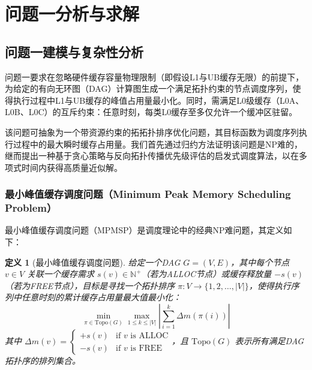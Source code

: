 \usepackage[utf8]{inputenc}
\usepackage{amssymb,amsthm}
\usepackage[ruled,vlined]{algorithm2e}  %
\usepackage{enumitem}

\newtheorem{theorem}{定理}
\newtheorem{lemma}{引理}
\newtheorem{definition}{定义}
\newtheorem{claim}{主张}


\section{问题一分析与求解}
\subsection{问题一建模与复杂性分析}
\label{subsec:problem1_analysis}

问题一要求在忽略硬件缓存容量物理限制（即假设L1与UB缓存无限）的前提下，为给定的有向无环图（DAG）计算图生成一个满足拓扑约束的节点调度序列，使得执行过程中L1与UB缓存的峰值占用量最小化。同时，需满足L0级缓存（L0A、L0B、L0C）的互斥约束：任意时刻，每类L0缓存至多仅允许一个缓冲区驻留。

该问题可抽象为一个带资源约束的拓拓扑排序优化问题，其目标函数为调度序列执行过程中的最大瞬时缓存占用量。我们首先通过归约方法证明该问题是NP难的，继而提出一种基于贪心策略与反向拓扑传播优先级评估的启发式调度算法，以在多项式时间内获得高质量近似解。

\subsubsection{最小峰值缓存调度问题（Minimum Peak Memory Scheduling Problem）}
\label{subsubsec:min_peak_problem}

最小峰值缓存调度问题（MPMSP）是调度理论中的经典NP难问题，其定义如下：

\begin{definition}[最小峰值缓存调度问题]
给定一个DAG $ G = (V, E) $，其中每个节点 $ v \in V $ 关联一个缓存需求 $ s(v) \in \mathbb{N}^+ $（若为ALLOC节点）或缓存释放量 $ -s(v) $（若为FREE节点），目标是寻找一个拓扑排序 $ \pi: V \to \{1, 2, \dots, |V|\} $，使得执行序列中任意时刻的累计缓存占用量最大值最小化：
\[
\min_{\pi \in \text{Topo}(G)} \max_{1 \leq k \leq |V|} \left| \sum_{i=1}^{k} \Delta m(\pi(i)) \right|
\]
其中 $ \Delta m(v) = \begin{cases} 
+s(v) & \text{if } v \text{ is ALLOC} \\
-s(v) & \text{if } v \text{ is FREE}
\end{cases} $，且 $ \text{Topo}(G) $ 表示所有满足DAG拓扑序的排列集合。
\end{definition}

